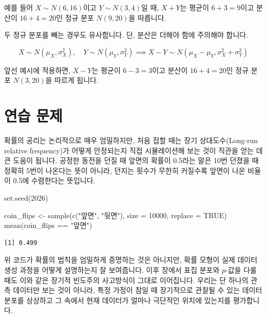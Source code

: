 \documentclass[
]{scrbook}
\newenvironment{Shaded}{}{}
\newcommand{\AttributeTok}[1]{\textcolor[rgb]{0.49,0.56,0.16}{#1}}
\newcommand{\ConstantTok}[1]{\textcolor[rgb]{0.53,0.00,0.00}{#1}}
\newcommand{\DecValTok}[1]{\textcolor[rgb]{0.25,0.63,0.44}{#1}}
\newcommand{\FunctionTok}[1]{\textcolor[rgb]{0.02,0.16,0.49}{#1}}
\newcommand{\NormalTok}[1]{#1}
\newcommand{\OtherTok}[1]{\textcolor[rgb]{0.00,0.44,0.13}{#1}}
\newcommand{\SpecialCharTok}[1]{\textcolor[rgb]{0.25,0.44,0.63}{#1}}
\newcommand{\StringTok}[1]{\textcolor[rgb]{0.25,0.44,0.63}{#1}}
\begin{document}
예를 들어 \(X \sim N(6, 16)\)이고 \(Y \sim N(3, 4)\)일 때, \(X+Y\)는
평균이 \(6+3=9\)이고 분산이 \(16+4=20\)인 정규 분포 \(N(9, 20)\)을
따릅니다.

두 정규 분포를 빼는 경우도 유사합니다. 단, 분산은 더해야 함에 주의해야
합니다.

\[
X \sim N(\mu_X, \sigma_X^2), \quad Y \sim N(\mu_Y, \sigma_Y^2) \implies X-Y \sim N(\mu_X-\mu_Y, \sigma_X^2+\sigma_Y^2)
\]

앞선 예시에 적용하면, \(X-Y\)는 평균이 \(6-3=3\)이고 분산이
\(16+4=20\)인 정규 분포 \(N(3, 20)\)을 따르게 됩니다.

\section{연습 문제}\label{uxc5f0uxc2b5-uxbb38uxc81c}

확률의 공리는 논리적으로 매우 엄밀하지만, 처음 접할 때는 장기
상대도수(Long-run relative frequency)가 어떻게 안정되는지 직접
시뮬레이션해 보는 것이 직관을 얻는 데 큰 도움이 됩니다. 공정한 동전을
던질 때 앞면의 확률이 0.5라는 말은 10번 던졌을 때 정확히 5번이 나온다는
뜻이 아니라, 던지는 횟수가 무한히 커질수록 앞면이 나온 비율이 0.5에
수렴한다는 뜻입니다.

\begin{Shaded}
\begin{Highlighting}[]
\FunctionTok{set.seed}\NormalTok{(}\DecValTok{2026}\NormalTok{)}

\NormalTok{coin\_flips }\OtherTok{\textless{}{-}} \FunctionTok{sample}\NormalTok{(}\FunctionTok{c}\NormalTok{(}\StringTok{"앞면"}\NormalTok{, }\StringTok{"뒷면"}\NormalTok{), }\AttributeTok{size =} \DecValTok{10000}\NormalTok{, }\AttributeTok{replace =} \ConstantTok{TRUE}\NormalTok{)}
\FunctionTok{mean}\NormalTok{(coin\_flips }\SpecialCharTok{==} \StringTok{"앞면"}\NormalTok{)}
\end{Highlighting}
\end{Shaded}

\begin{verbatim}
[1] 0.499
\end{verbatim}

위 코드가 확률의 법칙을 엄밀하게 증명하는 것은 아니지만, 확률 모형이
실제 데이터 생성 과정을 어떻게 설명하는지 잘 보여줍니다. 이후 장에서
표집 분포와 \(p\)-값을 다룰 때도 이와 같은 장기적 빈도주의 사고방식이
그대로 이어집니다. 우리는 단 하나의 관측 데이터만 보는 것이 아니라, 특정
가정이 참일 때 장기적으로 관찰될 수 있는 데이터 분포를 상상하고 그
속에서 현재 데이터가 얼마나 극단적인 위치에 있는지를 평가합니다.
\end{document}
